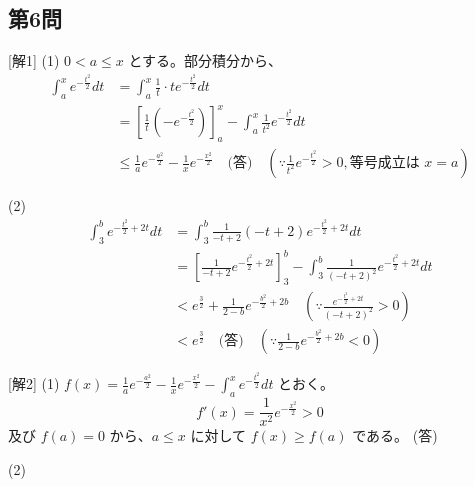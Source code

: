 \documentclass[../main.tex]{subfiles}
\begin{document}
\subsection*{第6問}
[解1] (1) $0 < a \le x$ とする。部分積分から、
\begin{align*}
  \int_a^x e^{-\frac{t^2}{2}} dt &= \int_a^x \frac{1}{t} \cdot t e^{-\frac{t^2}{2}} dt \\
  &= \left[ \frac{1}{t} (-e^{-\frac{t^2}{2}}) \right]_a^x - \int_a^x \frac{1}{t^2} e^{-\frac{t^2}{2}} dt \\
  &\le \frac{1}{a} e^{-\frac{a^2}{2}} - \frac{1}{x} e^{-\frac{x^2}{2}} \quad \text{(答)} \quad \left(\because \frac{1}{t^2} e^{-\frac{t^2}{2}} > 0, \text{等号成立は } x=a\right)
\end{align*}

(2)
\begin{align*}
  \int_3^b e^{-\frac{t^2}{2} + 2t} dt &= \int_3^b \frac{1}{-t+2} (-t+2) e^{-\frac{t^2}{2} + 2t} dt \\
  &= \left[ \frac{1}{-t+2} e^{-\frac{t^2}{2} + 2t} \right]_3^b - \int_3^b \frac{1}{(-t+2)^2} e^{-\frac{t^2}{2} + 2t} dt \\
  &< e^{\frac{3}{2}} + \frac{1}{2-b} e^{-\frac{b^2}{2} + 2b} \quad \left(\because \frac{e^{-\frac{t^2}{2} + 2t}}{(-t+2)^2} > 0\right) \\
  &< e^{\frac{3}{2}} \quad \text{(答)} \quad \left(\because \frac{1}{2-b} e^{-\frac{b^2}{2} + 2b} < 0\right)
\end{align*}

[解2] (1) $f(x) = \frac{1}{a} e^{-\frac{a^2}{2}} - \frac{1}{x} e^{-\frac{x^2}{2}} - \int_a^x e^{-\frac{t^2}{2}} dt$ とおく。
\[ f'(x) = \frac{1}{x^2} e^{-\frac{x^2}{2}} > 0 \]
及び $f(a) = 0$ から、$a \le x$ に対して $f(x) \ge f(a)$ である。 (答)

(2)
\end{document}
